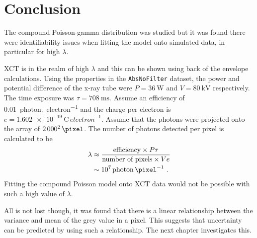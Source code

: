 \section{Conclusion}
The compound Poisson-gamma distribution was studied but it was found there were identifiability issues when fitting the model onto simulated data, in particular for high $\lambda$.

XCT is in the realm of high $\lambda$ and this can be shown using back of the envelope calculations. Using the properties in the \texttt{AbsNoFilter} dataset, the power and potential difference of the x-ray tube were $P=\SI{36}{\watt}$ and $V=\SI{80}{\kilo\volt}$ respectively. The time exposure was $\tau=\SI{708}{\milli\second}$. Assume an efficiency of \SI{0.01}{{photon.}{electron}^{-1}} and the charge per electron is $e=\SI{1.602e-19}{\coulomb\,{electron}^{-1}}$. Assume that the photons were projected onto the array of $2\,000^2\,\si{\pixel}$. The number of photons detected per pixel is calculated to be
\begin{align*}
\lambda &\approx \dfrac{\text{efficiency} \times P \tau}{\text{number of pixels} \times V e}
\\
&\sim 10^7\,\si{{photon}\,\pixel^{-1}}
\ .
\end{align*}
Fitting the compound Poisson model onto XCT data would not be possible with such a high value of $\lambda$.

All is not lost though, it was found that there is a linear relationship between the variance and mean of the grey value in a pixel. This suggests that uncertainty can be predicted by using such a relationship. The next chapter investigates this.
